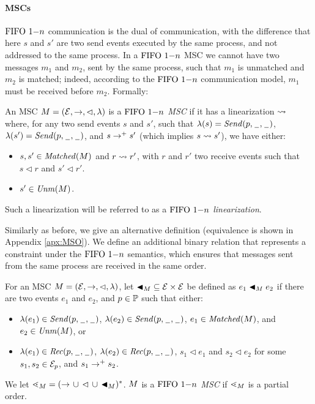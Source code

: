 \paragraph{\bf \onen MSCs}
 $\text{FIFO } 1\mathsf{-}n$ communication is the dual of \mb communication, with the difference that here $s$ and $s'$ are two send events executed by the same process, and not addressed to the same process. In a $\text{FIFO } 1\mathsf{-}n$ MSC we cannot have two messages $m_1$ and $m_2$, sent by the same process, such that $m_1$ is unmatched and $m_2$ is matched; indeed, according to the $\text{FIFO } 1\mathsf{-}n$ communication model, $m_1$ must be received before $m_2$.
Formally:
\begin{definition}\label{def:one_n}
An MSC $M = (\mathcal{E},\to,\lhd,\lambda)$ is a \emph{$\text{FIFO } 1\mathsf{-}n$ MSC} if it has a linearization $\rightsquigarrow$ where, for any two send events $s$ and $s'$, such that $\lambda(s)={\mathit{Send}(p,\hspace{0.1em}\underline{\hspace{0.5em}}\hspace{0.1em},\hspace{0.1em}\underline{\hspace{0.5em}}\hspace{0.1em})}$, $\lambda(s')={\mathit{Send}(p,\hspace{0.1em}\underline{\hspace{0.5em}}\hspace{0.1em},\hspace{0.1em}\underline{\hspace{0.5em}}\hspace{0.1em})}$, and $s \to^+ s'$ (which implies $s \rightsquigarrow s'$), we have either:
\begin{itemize}%
	\item $s,s' \in \mathit{Matched}(M)$ and $r \rightsquigarrow r'$, with  $r$ and $r'$  two receive events such that $s \lhd r$ and $s' \lhd r'$.
	\item $s' \in \mathit{Unm}(M)$.
\end{itemize}
\end{definition}

Such a linearization will be referred to as a \emph{$\text{FIFO } 1\mathsf{-}n$ linearization}. 

Similarly as before, we give an alternative definition (equivalence is shown in Appendix \ref{apx:MSO}). We define
	an additional binary relation that represents a constraint
	under the $\text{FIFO } 1\mathsf{-}n$ semantics, which ensures that messages sent from the same process are received in the same order. 

\begin{definition} \label{def:one_n_alt}
	For an MSC $M = (\mathcal{E},\to,\lhd,\lambda)$, let ${\blacktriangleleft}_M \subseteq \mathcal{E} \times \mathcal{E}$ be defined as $e_1 \blacktriangleleft_M e_2$ if there are two events $e_1$ and $e_2$, and $p \in \mathbb{P}$ such that either:
	\begin{itemize}%
		\item $\lambda(e_1) \in {\mathit{Send}(p,\hspace{0.1em}\underline{\hspace{0.5em}}\hspace{0.1em},\hspace{0.1em}\underline{\hspace{0.5em}}\hspace{0.1em})}$, $\lambda(e_2) \in {\mathit{Send}(p,\hspace{0.1em}\underline{\hspace{0.5em}}\hspace{0.1em},\hspace{0.1em}\underline{\hspace{0.5em}}\hspace{0.1em})}$, $e_1 \in \mathit{Matched}(M)$, and $e_2 \in \mathit{Unm}(M)$, or
		\item $\lambda(e_1) \in {\mathit{Rec}(p,\hspace{0.1em}\underline{\hspace{0.5em}}\hspace{0.1em},\hspace{0.1em}\underline{\hspace{0.5em}}\hspace{0.1em})}$, $\lambda(e_2) \in {\mathit{Rec}(p,\hspace{0.1em}\underline{\hspace{0.5em}}\hspace{0.1em},\hspace{0.1em}\underline{\hspace{0.5em}}\hspace{0.1em})}$, $s_1 \lhd e_1$ and $s_2 \lhd e_2$ for some $s_1,s_2 \in \mathcal{E}_p$, and $s_1 \to^+ s_2$.
	\end{itemize}
	
	We let ${\lessdot_M} = ({\to} \,\cup\, {\lhd} \,\cup\, {\blacktriangleleft_M})^\ast$.
	$M$ is a \emph{$\text{FIFO } 1\mathsf{-}n$ MSC}
	if ${\lessdot_M}$ is a partial order. 
\end{definition}

